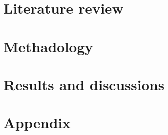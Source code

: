 \documentclass{article}
\begin{document}
\section{Literature review}

\section{Methadology}

\section{Results and discussions}

\section{Appendix}
\end{document}
